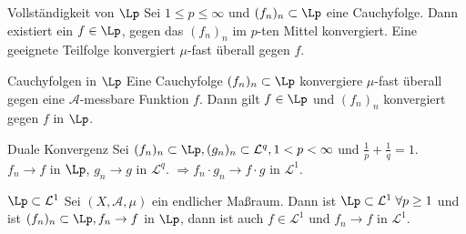 \begin{karte}{Vollständigkeit von \( \Lp \)}
    Sei \( 1 \leq p \leq \infty \) und \( (f_n)_n \subset \Lp \)
    eine Cauchyfolge. Dann existiert ein \( f\in \Lp \), 
    gegen das \( (f_n)_n \) im \(p\)-ten Mittel konvergiert. 
    Eine geeignete Teilfolge konvergiert \(\mu\)-fast überall gegen \(f\).
\end{karte}

\begin{karte}{Cauchyfolgen in \( \Lp \)}
    Eine Cauchyfolge \( (f_n)_n \subset \Lp \) konvergiere 
    \( \mu \)-fast überall gegen eine \( \mathcal{A} \)-messbare Funktion 
    \(f\). Dann gilt 
    \( f\in \Lp \) und \( (f_n)_n \) konvergiert gegen \(f\) in \(\Lp\).
\end{karte}

\begin{karte}{Duale Konvergenz}
    Sei \( (f_n)_n \subset \Lp, (g_n)_n \subset \mathcal{L}^q, 
    1 < p < \infty \) und \( \frac{1}{p} + \frac{1}{q} = 1 \).\\
    \( f_n \rightarrow f \) in \(\Lp\), 
    \( g_n \rightarrow g \) in \( \mathcal{L}^q \).
    \( \Rightarrow f_n \cdot g_n \rightarrow f \cdot g \) in \( \mathcal{L}^1 \).
\end{karte}

\begin{karte}{\( \Lp \subset \mathcal{L}^1 \)}
    Sei \( (X, \mathcal{A}, \mu) \) ein endlicher Maßraum. 
    Dann ist \( \Lp \subset \mathcal{L}^1 \;\forall p \geq 1 \) und 
    ist \( (f_n)_n \subset \Lp, f_n \rightarrow f \) in \(\Lp\), 
    dann ist auch \( f \in \mathcal{L}^1 \) und 
    \( f_n \rightarrow f \) in \( \mathcal{L}^1 \).
\end{karte}